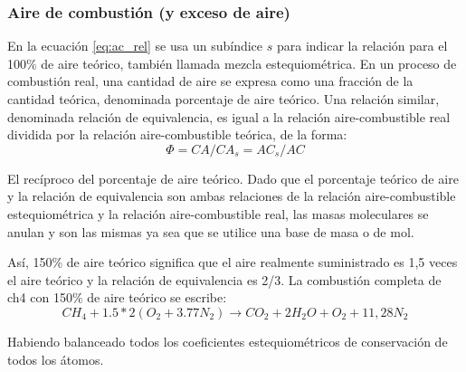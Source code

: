 \subsubsection{Aire de combustión (y exceso de aire)}
\par En la ecuación \ref{eq:ac_rel} se usa un subíndice $s$ para indicar la relación para el 100\% de aire teórico, también llamada mezcla estequiométrica. En un proceso de combustión real, una cantidad de aire se expresa como una fracción de la cantidad teórica, denominada porcentaje de aire teórico. Una relación similar, denominada relación de equivalencia, es igual a la relación aire-combustible real dividida por la relación aire-combustible teórica, de la forma:
\begin{equation}
    \Phi = CA/CA_s = AC_s/AC
\end{equation}
\par El recíproco del porcentaje de aire teórico. Dado que el porcentaje teórico de aire y la relación de equivalencia son ambas relaciones de la relación aire-combustible estequiométrica y la relación aire-combustible real, las masas moleculares se anulan y son las mismas ya sea que se utilice una base de masa o de mol.
\par Así, 150\% de aire teórico significa que el aire realmente suministrado es 1,5 veces el aire teórico y la relación de equivalencia es 2/3. La combustión completa de \ac{ch4} con 150\% de aire teórico se escribe:
\begin{equation}
CH_4 + 1.5*2(O_2 + 3.77N_2 ) \rightarrow CO_2 + 2H_2O + O_2 + 11,28N_2
\end{equation}

\par Habiendo balanceado todos los coeficientes estequiométricos de conservación de todos los átomos.

